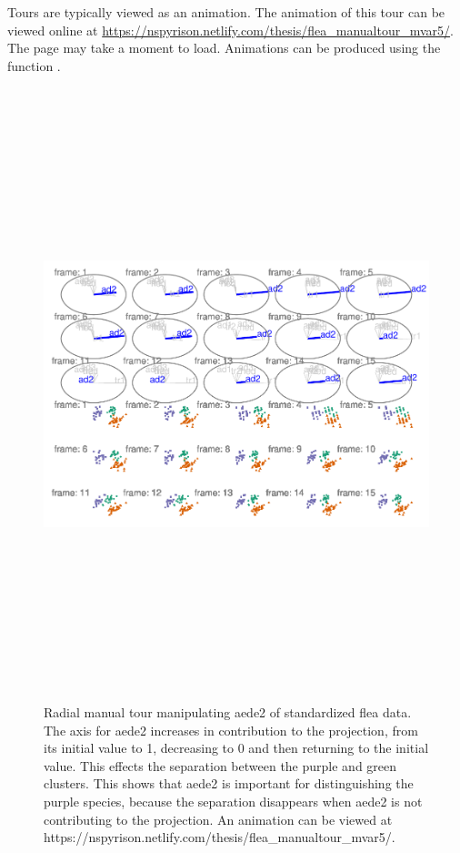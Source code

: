 Tours are typically viewed as an animation. The animation of this tour
can be viewed online at
\url{https://nspyrison.netlify.com/thesis/flea_manualtour_mvar5/}. The
page may take a moment to load. Animations can be produced using the
function .

\begin{Schunk}
\begin{figure}

{\centering \includegraphics[width=5.83in,height=7in]{spyrison-cook_files/figure-latex/step4-1} 

}

\caption[Radial manual tour manipulating aede2 of standardized flea data]{Radial manual tour manipulating aede2 of standardized flea data. The axis for aede2 increases in contribution to the projection, from its initial value to 1, decreasing to 0 and then returning to the initial value. This effects the separation between the purple and green clusters. This shows that aede2 is important for distinguishing the purple species, because the separation disappears when aede2 is not contributing to the projection. An animation can be viewed at https://nspyrison.netlify.com/thesis/flea\_manualtour\_mvar5/.}\label{fig:step4}
\end{figure}
\end{Schunk}

